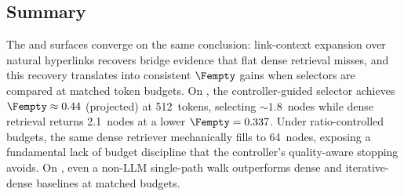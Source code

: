 \subsection{Summary}
\label{sec:results:summary}

The \IIRC and \TwoWikiShort surfaces converge on the same conclusion:
link-context expansion over natural hyperlinks recovers bridge evidence
that flat dense retrieval misses, and this recovery translates into
consistent $\Fempty$ gains when selectors are compared at matched
token budgets.
On \IIRC, the controller-guided selector achieves
$\Fempty \approx 0.44$ (projected) at 512~tokens, selecting
${\sim}1.8$~nodes while dense retrieval returns 2.1~nodes at a lower
$\Fempty = 0.337$.
Under ratio-controlled budgets, the same dense retriever mechanically
fills to 64~nodes, exposing a fundamental lack of budget discipline
that the controller's quality-aware stopping avoids.
On \TwoWikiShort, even a non-LLM single-path walk outperforms dense and
iterative-dense baselines at matched budgets.
